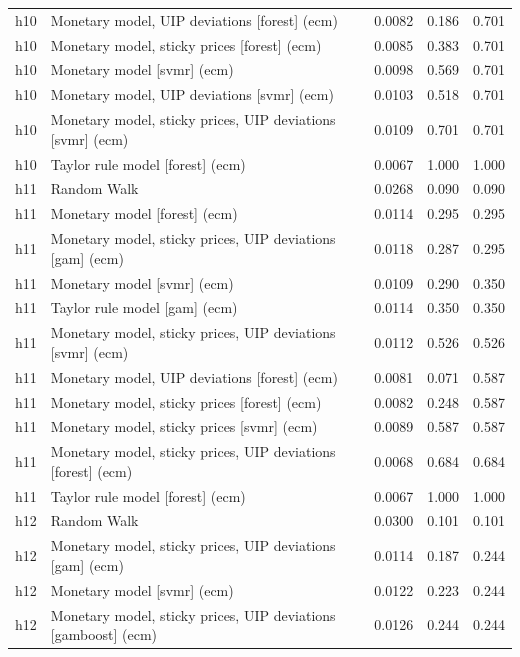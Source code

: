\begin{ThreePartTable}
\begin{longtable}[t]{cp{5.5cm}ccc}
h10 & \raggedright Monetary model, UIP deviations [forest] (ecm) & 0.0082 & 0.186 & 0.701\\
h10 & \raggedright Monetary model, sticky prices [forest] (ecm) & 0.0085 & 0.383 & 0.701\\
h10 & \raggedright Monetary model [svmr] (ecm) & 0.0098 & 0.569 & 0.701\\
h10 & \raggedright Monetary model, UIP deviations [svmr] (ecm) & 0.0103 & 0.518 & 0.701\\
h10 & \raggedright Monetary model, sticky prices, UIP deviations [svmr] (ecm) & 0.0109 & 0.701 & 0.701\\
h10 & \raggedright Taylor rule model [forest] (ecm) & 0.0067 & 1.000 & 1.000\\
\addlinespace
h11 & \raggedright Random Walk & 0.0268 & 0.090 & 0.090\\
h11 & \raggedright Monetary model [forest] (ecm) & 0.0114 & 0.295 & 0.295\\
h11 & \raggedright Monetary model, sticky prices, UIP deviations [gam] (ecm) & 0.0118 & 0.287 & 0.295\\
h11 & \raggedright Monetary model [svmr] (ecm) & 0.0109 & 0.290 & 0.350\\
h11 & \raggedright Taylor rule model [gam] (ecm) & 0.0114 & 0.350 & 0.350\\
h11 & \raggedright Monetary model, sticky prices, UIP deviations [svmr] (ecm) & 0.0112 & 0.526 & 0.526\\
h11 & \raggedright Monetary model, UIP deviations [forest] (ecm) & 0.0081 & 0.071 & 0.587\\
h11 & \raggedright Monetary model, sticky prices [forest] (ecm) & 0.0082 & 0.248 & 0.587\\
h11 & \raggedright Monetary model, sticky prices [svmr] (ecm) & 0.0089 & 0.587 & 0.587\\
h11 & \raggedright Monetary model, sticky prices, UIP deviations [forest] (ecm) & 0.0068 & 0.684 & 0.684\\
h11 & \raggedright Taylor rule model [forest] (ecm) & 0.0067 & 1.000 & 1.000\\
\addlinespace
h12 & \raggedright Random Walk & 0.0300 & 0.101 & 0.101\\
h12 & \raggedright Monetary model, sticky prices, UIP deviations [gam] (ecm) & 0.0114 & 0.187 & 0.244\\
h12 & \raggedright Monetary model [svmr] (ecm) & 0.0122 & 0.223 & 0.244\\
h12 & \raggedright Monetary model, sticky prices, UIP deviations [gamboost] (ecm) & 0.0126 & 0.244 & 0.244\\

\end{longtable}
\end{ThreePartTable}
